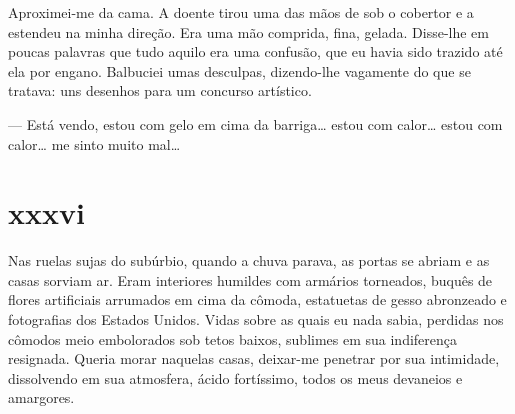 Aproximei-me da cama. A doente tirou uma das mãos de sob o cobertor e a
estendeu na minha direção. Era uma mão comprida, fina, gelada. Disse-lhe em
poucas palavras que tudo aquilo era uma confusão, que eu havia sido trazido
até ela por engano. Balbuciei umas desculpas, dizendo-lhe vagamente do que se
tratava: uns desenhos para um concurso artístico.





--- Está vendo, estou com gelo em cima da barriga\ldots{} estou com
    calor\ldots{} estou com calor\ldots{} me sinto muito mal\ldots{}


\section{xxxvi} 

 

Nas ruelas sujas do subúrbio, quando a chuva parava, as portas se abriam e as
casas sorviam ar. Eram interiores humildes com armários torneados, buquês de
flores artificiais arrumados em cima da cômoda, estatuetas de gesso
abronzeado e fotografias dos Estados Unidos. Vidas sobre as quais eu nada
sabia, perdidas nos cômodos meio embolorados sob tetos baixos, sublimes em
sua indiferença resignada. Queria morar naquelas casas, deixar-me penetrar
por sua intimidade, dissolvendo em sua atmosfera, ácido fortíssimo, todos os
meus devaneios e amargores.

